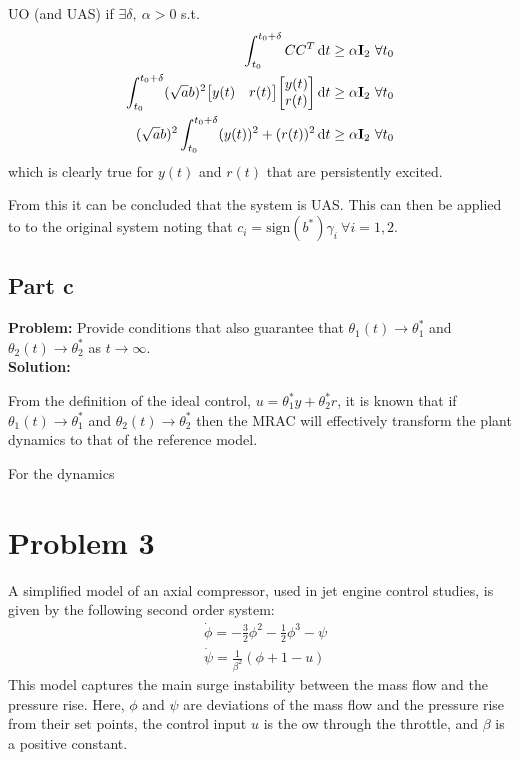 \documentclass[letter]{article}
\begin{document}
UO (and UAS) if $\exists \delta, \ \alpha > 0$ s.t.
\begin{align}
	\int_{t_0}^{t_0+\delta} C C^T \dd{t}
	&\geq \alpha \vb{I}_2 \ \forall t_0\\
	\int_{t_0}^{t_0+\delta} (\sqrt{a} b)^2 \mqty[y(t) & r(t)] \mqty[y(t) \\ r(t)]  \dd{t}
	&\geq \alpha \vb{I}_2 \ \forall t_0\\
	(\sqrt{a} b)^2 \int_{t_0}^{t_0+\delta} (y(t))^2 + (r(t))^2 \dd{t}
	&\geq \alpha \vb{I}_2 \ \forall t_0
\end{align}
which is clearly true for $y(t)$ and $r(t)$ that are persistently excited.

From this it can be concluded that the system is UAS. This can then be applied to to the original system noting that $c_i = \text{sign}(b^*) \gamma_i \ \forall i = 1,2$.





\subsection{Part c}
\textbf{Problem:}
Provide conditions that also guarantee that $\theta_1(t) \to \theta_1^*$ and $\theta_2(t) \to \theta_2^*$ as $t\to\infty$.\\

\noindent
\textbf{Solution:}

From the definition of the ideal control, $u = \theta_1^* y + \theta_2^* r$, it is known that if $\theta_1(t) \to \theta_1^*$ and $\theta_2(t) \to \theta_2^*$ then the MRAC will effectively transform the plant dynamics to that of the reference model.

For the dynamics 










\newpage
\section{Problem 3}
A simplified model of an axial compressor, used in jet engine control studies, is given by the following second order system:
\begin{equation}
	\begin{aligned}
		&\dot{\phi} = - \frac{3}{2} \phi^2 - \frac{1}{2} \phi^3 - \psi\\
		&\dot{\psi} = \frac{1}{\beta^2}(\phi + 1 - u)
	\end{aligned}
\end{equation}
This model captures the main surge instability between the mass flow and the pressure rise. Here, $\phi$ and $\psi$ are deviations of the mass flow and the pressure rise from their set points, the control input $u$ is the 
ow through the throttle, and $\beta$ is a positive constant.
\end{document}
